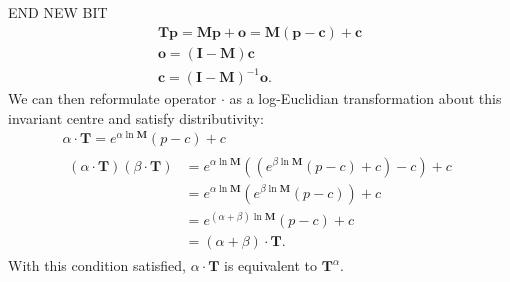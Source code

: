END NEW BIT
        \begin{gather}
          \mathbf{Tp} = \mathbf{Mp} + \mathbf{o} = \mathbf{M}(\mathbf{p}-\mathbf{c}) + \mathbf{c} \\
          \mathbf{o} = (\mathbf{I} - \mathbf{M})\mathbf{c} \\
          \mathbf{c} = (\mathbf{I} - \mathbf{M})^{-1}\mathbf{o}.
        \end{gather}
        We can then reformulate operator $\cdot$ as a log-Euclidian transformation about this invariant centre and satisfy distributivity:
        \begin{gather}
          \alpha \cdot \mathbf{T} = e^{\alpha\ln\mathbf{M}}(p - c) + c \label{eqn:affine_cdot} \\
          \begin{split}
            (\alpha \cdot \mathbf{T})(\beta \cdot \mathbf{T}) &= e^{\alpha\ln\mathbf{M}}((e^{\beta\ln\mathbf{M}}(p - c) + c) - c) + c \\
                                                              &= e^{\alpha\ln\mathbf{M}}(e^{\beta\ln\mathbf{M}}(p - c)) + c \\
                                                              &= e^{(\alpha + \beta)\ln\mathbf{M}}(p - c) + c \\
                                                              &= (\alpha + \beta) \cdot \mathbf{T}.
          \end{split}
        \end{gather}
        With this condition satisfied, $\alpha\cdot\mathbf{T}$ is equivalent to $\mathbf{T}^{\alpha}$.
        
